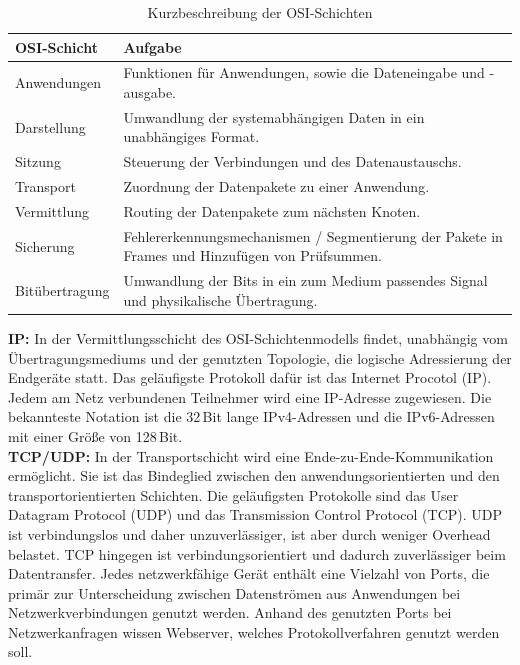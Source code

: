 \newpage

\begin{table}[tbt]
\caption[Kurzbeschreibung der OSI-Schichten]{Kurzbeschreibung der OSI-Schichten \cite{ekOSI}}
\label{tab:OSISchichtenbeschreibung}
\begin{center}
    \begin{tabular}{ l  p{8cm} }
    \toprule
     OSI-Schicht & Aufgabe \\ 
     \midrule
        
    Anwendungen & Funktionen für Anwendungen, sowie die Dateneingabe und -ausgabe. \\

    Darstellung & Umwandlung der systemabhängigen Daten in ein unabhängiges Format.  \\

    Sitzung & Steuerung der Verbindungen und des Datenaustauschs.  \\

    Transport & Zuordnung der Datenpakete zu einer Anwendung. \\
    
	Vermittlung & Routing der Datenpakete zum nächsten Knoten. \\
	
	Sicherung & Fehlererkennungsmechanismen / Segmentierung der Pakete in Frames und Hinzufügen von Prüfsummen.  \\
    
    Bitübertragung & Umwandlung der Bits in ein zum Medium passendes Signal und physikalische Übertragung.\\ 
    \bottomrule
    \end{tabular}
\end{center}
\end{table}

\noindent
{}
\textbf{IP:}
In der Vermittlungsschicht des OSI-Schichtenmodells findet, unabhängig vom Über\-tra\-gungs\-mediums und der genutzten Topologie, die logische Adressierung der Endgeräte statt. Das geläufigste Protokoll dafür ist das Internet Procotol (IP). Jedem am Netz verbundenen Teilnehmer wird eine IP-Adresse zugewiesen. Die bekannteste Notation ist die 32\,Bit lange IPv4-Adressen und die IPv6-Adressen mit einer Größe von 128\,Bit.\\

\noindent
{}
\textbf{TCP/UDP:}
In der Transportschicht wird eine Ende-zu-Ende-Kommunikation ermöglicht. 
Sie ist das Bindeglied zwischen den anwendungsorientierten und den transportorientierten Schichten. 
Die geläufigsten Protokolle sind das User Datagram Protocol (UDP) und das Transmission Control Protocol (TCP).
UDP ist verbindungslos und daher unzuverlässiger, ist aber durch weniger Overhead belastet.
TCP hingegen ist verbindungsorientiert und dadurch zuverlässiger beim Datentransfer.
Jedes netzwerkfähige Gerät enthält eine Vielzahl von Ports, die primär zur
Unterscheidung zwischen Datenströmen aus Anwendungen bei Netzwerkverbindungen
genutzt werden. Anhand des genutzten Ports bei Netzwerkanfragen
wissen Webserver, welches Protokollverfahren genutzt werden soll.

